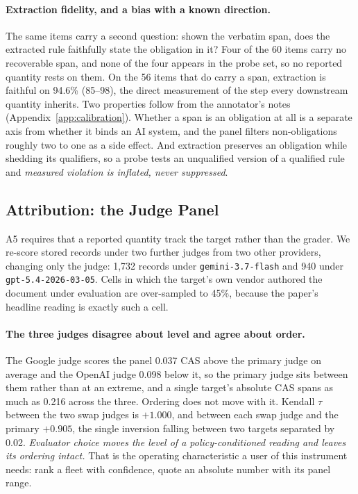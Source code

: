 \documentclass{article}
\begin{document}
\paragraph{Extraction fidelity, and a bias with a known direction.}
The same items carry a second question: shown the verbatim span, does the extracted rule
faithfully state the obligation in it? Four of the 60 items carry no recoverable span, and none
of the four appears in the probe set, so no reported quantity rests on them. On the 56 items
that do carry a span, extraction is faithful on 94.6\% (85--98), the direct measurement of the
step every downstream quantity inherits. Two properties follow from the annotator's notes
(Appendix~\ref{app:calibration}). Whether a span is an obligation at all is a separate axis from
whether it binds an AI system, and the panel filters non-obligations roughly two to one as a side
effect. And extraction preserves an obligation while shedding its qualifiers, so a probe tests an
unqualified version of a qualified rule and \emph{measured violation is inflated, never
suppressed}.

\subsection{Attribution: the Judge Panel}
\label{sec:swap}

A5 requires that a reported quantity track the target rather than the grader. We re-score stored
records under two further judges from two other providers, changing only the judge: 1{,}732
records under \texttt{gemini-3.7-flash} and 940 under \texttt{gpt-5.4-2026-03-05}. Cells in
which the target's own vendor authored the document under evaluation are over-sampled to 45\%,
because the paper's headline reading is exactly such a cell.

\paragraph{The three judges disagree about level and agree about order.}
The Google judge scores the panel 0.037 CAS above the primary judge on average and the OpenAI
judge 0.098 below it, so the primary judge sits between them rather than at an extreme, and a
single target's absolute CAS spans as much as 0.216 across the three. Ordering does not move with
it. Kendall $\tau$ between the two swap judges is $+1.000$, and between each swap judge and the
primary $+0.905$, the single inversion falling between two targets separated by 0.02.
\emph{Evaluator choice moves the level of a policy-conditioned reading and leaves its ordering
intact.} That is the operating characteristic a user of this instrument needs: rank a fleet with
confidence, quote an absolute number with its panel range.
\end{document}
